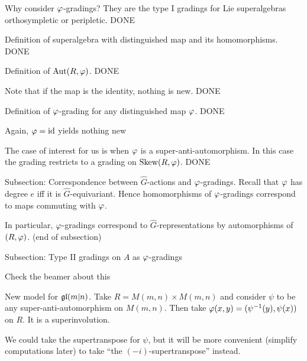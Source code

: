 \documentclass{amsbook}
\newcommand{\cmark}{\ding{51}}%
\newcommand{\done}{\rlap{$\square$}{\raisebox{2pt}{\large\hspace{1pt}\cmark}}%
\hspace{-2.5pt}}
\begin{document}
    \begin{todolist}
        \item[\done] Why consider $\varphi$-gradings? They are the type I gradings for Lie superalgebras orthosympletic or peripletic. DONE
        
        \item[\done] Definition of superalgebra with distinguished map and its homomorphisms. DONE
        
        \item[\done] Definition of $\operatorname{Aut} (R, \varphi)$. DONE
        
        \item[\done] Note that if the map is the identity, nothing is new. DONE
        
        \item[\done] Definition of $\varphi$-grading for any distinguished map $\varphi$. DONE
        
        \item Again, $\varphi = \operatorname{id}$ yields nothing new
        
        \item[\done] The case of interest for us is when $\varphi$ is a super-anti-automorphism. In this case the grading restricts to a grading on $\operatorname{Skew}(R, \varphi)$. DONE
        
        \item Subsection: Correspondence between $\widehat G$-actions and $\varphi$-gradings. Recall that $\varphi$ has degree $e$ iff it is $\widehat G$-equivariant. Hence homomorphisms of $\varphi$-gradings correspond to maps commuting with $\varphi$.
        
        \item In particular, $\varphi$-gradings correspond to $\widehat G$-representations by automorphisms of $(R, \varphi)$. (end of subsection)
        
        \item Subsection: Type II gradings on $A$ as $\varphi$-gradings
        
        \item Check the beamer about this
        
        \item New model for $\mathfrak{gl}(m|n)$. Take $R = M(m,n) \times M(m,n)$ and consider $\psi$ to be any super-anti-automorphism on $M(m,n)$. Then take $\varphi (x, y) = (\psi^{-1} (y) , \psi (x) )$ on $R$. It is a superinvolution.
        
        \item We could take the supertranspose for $\psi$, but it will be more convenient (simplify computations later) to take ``the $(-i)$-supertranspose'' instead.
        

\end{todolist}
\end{document}
